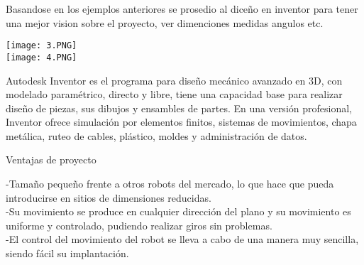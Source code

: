 \documentclass[12pt,letterpaper]{report}
\begin{document}
\begin{center}
\begin{flushleft}
\begin{flushleft}
\begin{flushleft}
\begin{center}
\begin{flushleft}
\begin{flushleft}
Basandose en los ejemplos anteriores se prosedio al diceño en inventor para tener una mejor vision sobre el proyecto, ver dimenciones medidas angulos etc.\\
\begin{center}
\texttt{[image: 3.PNG]} \\
\texttt{[image: 4.PNG]} 
\begin{flushleft}
Autodesk Inventor es el programa para diseño mecánico avanzado en 3D, con modelado paramétrico, directo y libre, tiene una capacidad base para realizar diseño de piezas, sus dibujos y ensambles de partes. En una versión profesional, Inventor ofrece simulación por elementos finitos, sistemas de movimientos, chapa metálica, ruteo de cables, plástico, moldes y administración de datos.
\begin{flushleft}
Ventajas de proyecto
\begin{flushleft}
-Tamaño pequeño frente a otros robots del mercado, lo que hace que pueda introducirse en sitios de dimensiones reducidas.\\
-Su movimiento se produce en cualquier dirección del plano y su movimiento es uniforme y controlado, pudiendo realizar giros sin problemas.\\
-El control del movimiento del robot se lleva a cabo de una manera muy sencilla, siendo fácil su implantación.

\end{flushleft}
\end{flushleft}
\end{flushleft}
\end{center}
\end{flushleft}
\end{flushleft}
\end{center}
\end{flushleft}
\end{flushleft}
\end{flushleft}
\end{center}
\end{document}

